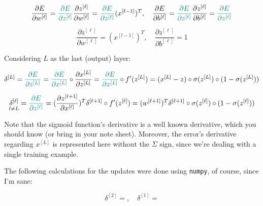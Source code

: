 \documentclass[12pt]{article}
\begin{document}
\begin{enumerate}[leftmargin=\labelsep]
  \begin{equation*}
    \frac{\partial E}{\partial w^{[\ell]}} = \textcolor{teal}{\frac{\partial E}{\partial z^{[\ell]}}} \frac{\partial z^{[\ell]}}{\partial w^{[\ell]}} = \textcolor{teal}{\frac{\partial E}{\partial z^{[\ell]}}} (x^{[\ell-1]})^T, \quad
    \frac{\partial E}{\partial b^{[\ell]}} = \textcolor{teal}{\frac{\partial E}{\partial z^{[\ell]}}} \frac{\partial z^{[\ell]}}{\partial b^{[\ell]}} = \textcolor{teal}{\frac{\partial E}{\partial z^{[\ell]}}}
  \end{equation*}

  \begin{equation*}
    \frac{\partial z^{[\ell]}}{\partial w^{[\ell]}} = (x^{[l-1]})^T, \quad
    \frac{\partial z^{[\ell]}}{\partial b^{[\ell]}} = 1
  \end{equation*}

  Considering $L$ as the last (output) layer:

  \begin{equation*}
    \delta^{[L]} = \textcolor{teal}{\frac{\partial E}{\partial z^{[L]}}}
    = \textcolor{teal}{\frac{\partial E}{\partial x^{[L]}}} \circ \frac{\partial x^{[L]}}{\partial z^{[L]}}
    = \textcolor{teal}{\frac{\partial E}{\partial x^{[L]}}} \circ f'(z^{[L]})
    = (x^{[L]} - z) \circ \sigma(z^{[L]}) \circ (1 - \sigma(z^{[L]}))
  \end{equation*}

  \begin{equation*}
    \underset{l \neq L}{\delta^{[\ell]}} = \textcolor{teal}{\frac{\partial E}{\partial z^{[\ell]}}}
    = (\frac{\partial z^{[\ell+1]}}{\partial x^{[\ell]}})^T \delta^{[\ell+1]} \circ f'(z^{[\ell]})
    = (w^{[\ell+1]})^T \delta^{[\ell+1]} \circ \sigma(z^{[\ell]}) \circ (1 - \sigma(z^{[\ell]}))
  \end{equation*}

  Note that the sigmoid function's derivative is a well known derivative,
  which you should know (or bring in your note sheet). Moreover, the error's
  derivative regarding $x^{[L]}$ is represented here without the $\Sigma$ sign,
  since we're dealing with a single training example.

  The following calculations for the updates were done using \texttt{numpy}, of course, since I'm sane:

  \begin{equation*}
    \delta^{[2]} = , \quad \delta^{[1]} = 
  \end{equation*}


\end{enumerate}
\end{document}
